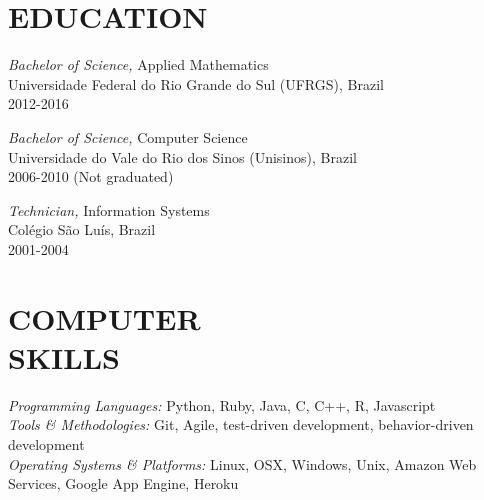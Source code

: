 \documentclass[line,margin]{res}
\begin{document}
\address{Porto Alegre, Rio Grande do Sul, Brazil}
\address{+55 51 8216 1084, fmagalhaes@gmail.com}
\address{GitHub: https://github.com/fabiogm}

\begin{resume}
 
\section{EDUCATION} {\sl Bachelor of Science,} Applied Mathematics \\
                Universidade Federal do Rio Grande do Sul (UFRGS), Brazil \\ 
                2012-2016

                   {\sl Bachelor of Science,} Computer Science \\
                Universidade do Vale do Rio dos Sinos (Unisinos), Brazil \\
                2006-2010 (Not graduated)

                   {\sl Technician,} Information Systems \\
                Colégio São Luís, Brazil \\
                2001-2004

 
\section{COMPUTER \\ SKILLS} {\sl Programming Languages:} Python, Ruby, Java, C, C++, R, Javascript\\
		{\sl Tools \& Methodologies:} Git, Agile, test-driven development, behavior-driven development\\
                {\sl Operating Systems \& Platforms:} Linux, OSX, Windows, Unix, Amazon Web Services, Google App Engine, Heroku
 

\end{resume}
\end{document}

